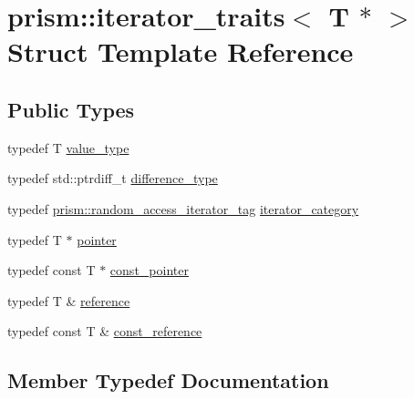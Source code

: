 \hypertarget{structprism_1_1iterator__traits_3_01_t_01_5_01_4}{}\section{prism\+:\+:iterator\+\_\+traits$<$ T $\ast$ $>$ Struct Template Reference}
\label{structprism_1_1iterator__traits_3_01_t_01_5_01_4}
\subsection*{Public Types}
\begin{DoxyCompactItemize}
\item 
typedef T \hyperlink{structprism_1_1iterator__traits_3_01_t_01_5_01_4_aba0237486c133218e1fe55040e667b42}{value\+\_\+type}
\item 
typedef std\+::ptrdiff\+\_\+t \hyperlink{structprism_1_1iterator__traits_3_01_t_01_5_01_4_ae1ff2b10c08886cd34b9e09a73a4a309}{difference\+\_\+type}
\item 
typedef \hyperlink{structprism_1_1random__access__iterator__tag}{prism\+::random\+\_\+access\+\_\+iterator\+\_\+tag} \hyperlink{structprism_1_1iterator__traits_3_01_t_01_5_01_4_a493063ea0c7f896aef5a6979ad6da97c}{iterator\+\_\+category}
\item 
typedef T $\ast$ \hyperlink{structprism_1_1iterator__traits_3_01_t_01_5_01_4_a23fbd7c0b83a23804b00b3d9b77a09c5}{pointer}
\item 
typedef const T $\ast$ \hyperlink{structprism_1_1iterator__traits_3_01_t_01_5_01_4_a811e260626465057dfd3445acce418b6}{const\+\_\+pointer}
\item 
typedef T \& \hyperlink{structprism_1_1iterator__traits_3_01_t_01_5_01_4_add9024b705e4daf7ac40941cb160f786}{reference}
\item 
typedef const T \& \hyperlink{structprism_1_1iterator__traits_3_01_t_01_5_01_4_a9c0e20fc4a15a41a9bd9b44496c9fcbf}{const\+\_\+reference}
\end{DoxyCompactItemize}


\subsection{Member Typedef Documentation}
